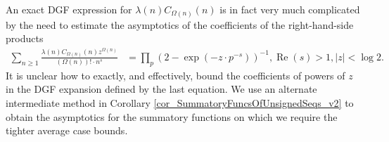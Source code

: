 \documentclass[11pt,reqno,a4letter]{article}
\numberwithin{figure}{section}
\numberwithin{table}{section}
\theoremstyle{plain}
\numberwithin{theorem}{section}
\theoremstyle{definition}
\renewcommand{\Re}{\operatorname{Re}}
\begin{document}
An exact DGF expression for 
$\lambda(n) C_{\Omega(n)}(n)$ is in fact very much complicated by the need to estimate the asymptotics 
of the coefficients of the right-hand-side products 
\begin{align*} 
\sum_{n \geq 1} \frac{\lambda(n) C_{\Omega(n)}(n) z^{\Omega(n)}}{(\Omega(n))! \cdot n^s} & = 
     \prod_p \left(2 - \exp\left(-z \cdot p^{-s}\right)\right)^{-1}, 
     \Re(s) > 1, |z| < \log 2. 
\end{align*} 
It is unclear how to exactly, and effectively, bound the 
coefficients of powers of $z$ in the DGF expansion defined by the last equation. 
We use an alternate intermediate method in 
Corollary \ref{cor_SummatoryFuncsOfUnsignedSeqs_v2} 
to obtain the asymptotics for the 
summatory functions on which we require the tighter average case bounds. 
\end{document}

